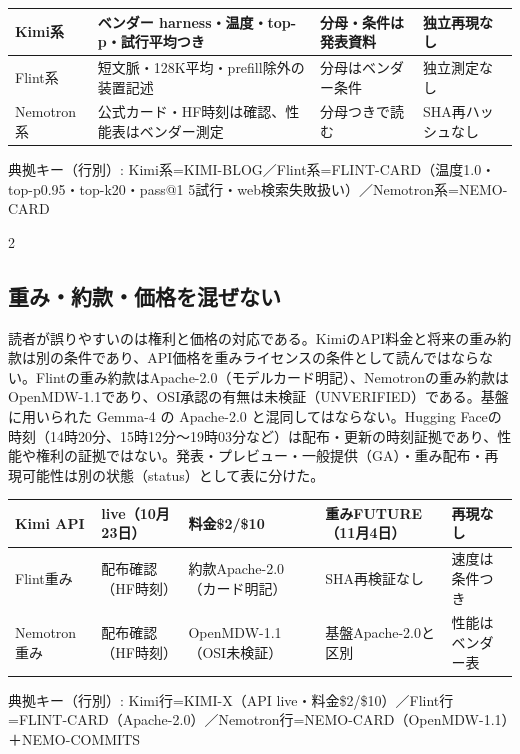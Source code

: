 \documentclass[lualatex,a4paper,10pt]{jlreq}
\begin{document}
{\centering\footnotesize
{}
\begin{tabularx}{0.96\linewidth}{@{}lXXX@{}}
\toprule
Kimi系 & ベンダー harness・温度・top-p・試行平均つき & 分母・条件は発表資料 & 独立再現なし \\
\midrule
Flint系 & 短文脈・128K平均・prefill除外の装置記述 & 分母はベンダー条件 & 独立測定なし \\
Nemotron系 & 公式カード・HF時刻は確認、性能表はベンダー測定 & 分母つきで読む & SHA再ハッシュなし \\
\bottomrule
\end{tabularx}
{\scriptsize\color{SurveyMuted} 典拠キー（行別）: Kimi系=KIMI-BLOG／Flint系=FLINT-CARD（温度1.0・top-p0.95・top-k20・pass@1 5試行・web検索失敗扱い）／Nemotron系=NEMO-CARD\par}
} %
\begin{multicols}{2} %


\subsection*{重み・約款・価格を混ぜない}


読者が誤りやすいのは権利と価格の対応である。KimiのAPI料金と将来の重み約款は別の条件であり、API価格を重みライセンスの条件として読んではならない。Flintの重み約款はApache-2.0（モデルカード明記）、Nemotronの重み約款はOpenMDW-1.1であり、OSI承認の有無は未検証（UNVERIFIED）である。基盤に用いられた Gemma-4 の Apache-2.0 と混同してはならない。Hugging Faceの時刻（14時20分、15時12分～19時03分など）は配布・更新の時刻証拠であり、性能や権利の証拠ではない。発表・プレビュー・一般提供（GA）・重み配布・再現可能性は別の状態（status）として表に分けた。


\end{multicols} %
{\centering\footnotesize
{}
\begin{tabularx}{0.96\linewidth}{@{}XXXXX@{}}
\toprule
Kimi API & live（10月23日） & 料金\$2/\$10 & 重みFUTURE（11月4日） & 再現なし \\
\midrule
Flint重み & 配布確認（HF時刻） & 約款Apache-2.0（カード明記） & SHA再検証なし & 速度は条件つき \\
Nemotron重み & 配布確認（HF時刻） & OpenMDW-1.1（OSI未検証） & 基盤Apache-2.0と区別 & 性能はベンダー表 \\
\bottomrule
\end{tabularx}
{\scriptsize\color{SurveyMuted} 典拠キー（行別）: Kimi行=KIMI-X（API live・料金\$2/\$10）／Flint行=FLINT-CARD（Apache-2.0）／Nemotron行=NEMO-CARD（OpenMDW-1.1）＋NEMO-COMMITS\par}
} %
\end{document}
